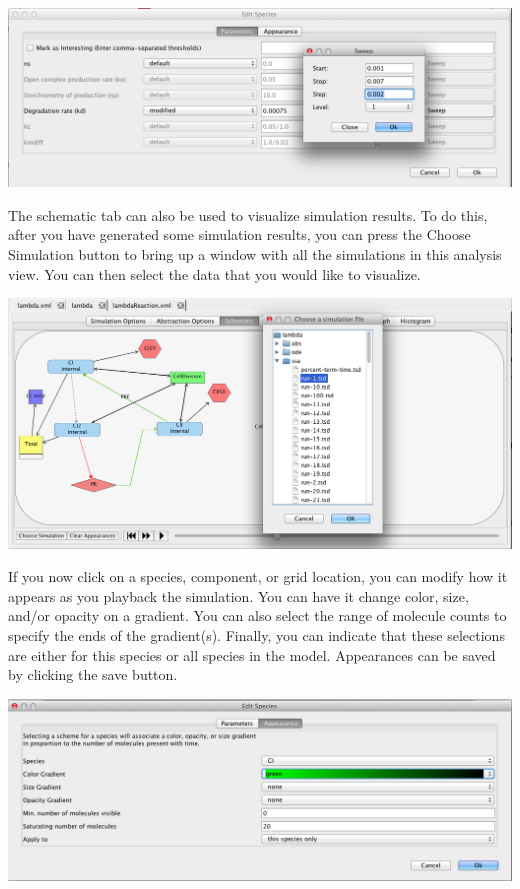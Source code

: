 \documentclass[titlepage,11pt]{article}
\begin{document}
\begin{center}
\includegraphics[width=160mm]{screenshots/sweep}
\end{center}

The schematic tab can also be used to visualize simulation results.  To do this, after you have generated some simulation results, you can press the Choose Simulation button to bring up a window with all the simulations in this analysis view.  You can then select the data that you would like to visualize.

\begin{center}
\includegraphics[width=160mm]{screenshots/chooseSim}
\end{center}

If you now click on a species, component, or grid location, you can modify how it appears as you playback the simulation.  You can have it change color, size, and/or opacity on a gradient.  You can also select the range of molecule counts to specify the ends of the gradient(s).  Finally, you can indicate that these selections are either for this species or all species in the model.  Appearances can be saved by clicking the save button.

\begin{center}
\includegraphics[width=160mm]{screenshots/editSpeciesAppearance}
\end{center}
\end{document}
